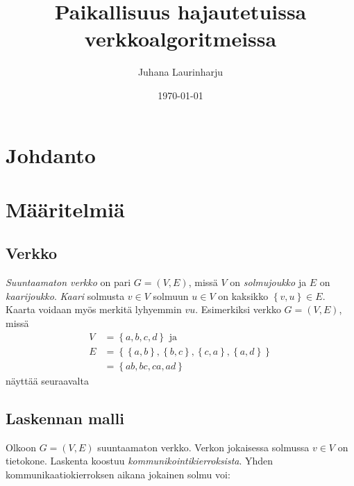 \documentclass[finnish]{tktltiki2}
\title{Paikallisuus hajautetuissa verkkoalgoritmeissa}
\author{Juhana Laurinharju}
\date{\today}
\theoremstyle{definition}
\theoremstyle{remark}
\newcommand{\set}[1]{\left\{ #1 \right\}}
\begin{document}

\maketitle        %

\newpage          %



\section*{Johdanto}

\section{Määritelmiä}

\subsection{Verkko}

\emph{Suuntaamaton verkko} on pari $G = (V,E)$, missä $V$ on \emph{solmujoukko}
ja $E$ on \emph{kaarijoukko}. \emph{Kaari} solmusta $v \in V$ solmuun $u \in V$
on kaksikko $\set{v,u} \in E$. Kaarta voidaan myös merkitä lyhyemmin $vu$.
Esimerkiksi verkko $G = (V,E)$, missä
%
\begin{align*}
    V &= \set{a,b,c,d} \text{ ja}\\
    E &= \set{ \set{a,b}, \set{b,c}, \set{c,a}, \set{a,d}} \\
      &= \set{ab, bc, ca, ad}
\end{align*}
%
näyttää seuraavalta
%
\begin{center}
\end{center}

\subsection{Laskennan malli}

Olkoon $G = (V,E)$ suuntaamaton verkko. Verkon jokaisessa solmussa $v \in V$ on
tietokone. Laskenta koostuu \emph{kommunikointikierroksista}. Yhden
kommunikaatiokierroksen aikana jokainen solmu voi:
\end{document}
